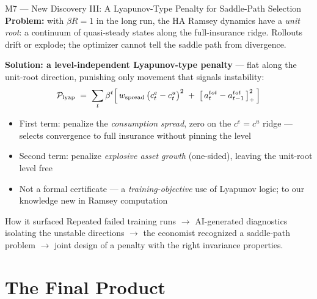 \documentclass[10pt,aspectratio=169]{beamer}
\begin{document}
\begin{frame}{M7 --- New Discovery III: A Lyapunov-Type Penalty for Saddle-Path Selection}
{\small\textbf{Problem:} with $\beta R = 1$ in the long run, the HA Ramsey dynamics have a \emph{unit root}:
a continuum of quasi-steady states along the full-insurance ridge. Rollouts drift or explode;
the optimizer cannot tell the saddle path from divergence.}

\smallskip
{\small\textbf{Solution: a level-independent Lyapunov-type penalty} --- flat along the unit-root
direction, punishing only movement that signals instability:}
\vspace{-0.1cm}
\[
\small
\mathcal{P}_{\text{lyap}} \;=\; \sum_t \beta^t \Big[\, w_{\text{spread}}\,\big(c^e_t - c^u_t\big)^2
\;+\; \big[\,a^{tot}_t - a^{tot}_{t-1}\,\big]_+^2 \,\Big]
\]
\vspace{-0.35cm}
\begin{itemize}\small
    \item First term: penalize the \emph{consumption spread}, zero on the $c^e = c^u$ ridge ---
          selects convergence to full insurance without pinning the level
    \item Second term: penalize \emph{explosive asset growth} (one-sided), leaving the unit-root level free
    \item Not a formal certificate --- a \emph{training-objective} use of Lyapunov logic;
          to our knowledge new in Ramsey computation
\end{itemize}

\smallskip
\begin{exampleblock}{How it surfaced}
\small Repeated failed training runs $\to$ AI-generated diagnostics isolating the
unstable directions $\to$ the economist recognized a saddle-path problem $\to$ joint design
of a penalty with the right invariance properties.
\end{exampleblock}
\end{frame}

\section{The Final Product}
\end{document}
